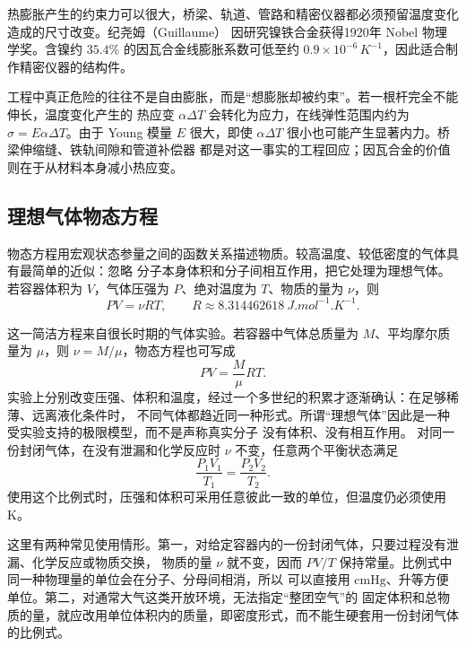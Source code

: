 热膨胀产生的约束力可以很大，桥梁、轨道、管路和精密仪器都必须预留温度变化造成的尺寸改变。纪尧姆（Guillaume）
因研究镍铁合金获得1920年 Nobel 物理学奖。含镍约 $35.4\%$ 的因瓦合金线膨胀系数可低至约
$0.9\times10^{-6}\,\si{K^{-1}}$，因此适合制作精密仪器的结构件。

工程中真正危险的往往不是自由膨胀，而是“想膨胀却被约束”。若一根杆完全不能伸长，温度变化产生的
热应变 $\alpha\Delta T$ 会转化为应力，在线弹性范围内约为 $\sigma=E\alpha\Delta T$。由于 Young
模量 $E$ 很大，即使 $\alpha\Delta T$ 很小也可能产生显著内力。桥梁伸缩缝、铁轨间隙和管道补偿器
都是对这一事实的工程回应；因瓦合金的价值则在于从材料本身减小热应变。

\subsection{理想气体物态方程}\label{ch14:sec:ideal-gas}

物态方程用宏观状态参量之间的函数关系描述物质。较高温度、较低密度的气体具有最简单的近似：忽略
分子本身体积和分子间相互作用，把它处理为理想气体。若容器体积为 $V$，气体压强为 $P$、绝对温度为
$T$、物质的量为 $\nu$，则
\begin{equation}
  \boxed{PV=\nu RT},
  \qquad R\approx\SI{8.314462618}{J.mol^{-1}.K^{-1}}.
\end{equation}

这一简洁方程来自很长时期的气体实验。若容器中气体总质量为 $M$、平均摩尔质量为 $\mu$，则
$\nu=M/\mu$，物态方程也可写成
\begin{equation}
  PV=\frac{M}{\mu}RT.
\end{equation}
实验上分别改变压强、体积和温度，经过一个多世纪的积累才逐渐确认：在足够稀薄、远离液化条件时，
不同气体都趋近同一种形式。所谓“理想气体”因此是一种受实验支持的极限模型，而不是声称真实分子
没有体积、没有相互作用。
对同一份封闭气体，在没有泄漏和化学反应时 $\nu$ 不变，任意两个平衡状态满足
\begin{equation}
  \boxed{\frac{P_1V_1}{T_1}=\frac{P_2V_2}{T_2}}.
\end{equation}
使用这个比例式时，压强和体积可采用任意彼此一致的单位，但温度仍必须使用 K。

这里有两种常见使用情形。第一，对给定容器内的一份封闭气体，只要过程没有泄漏、化学反应或物质交换，
物质的量 $\nu$ 就不变，因而 $PV/T$ 保持常量。比例式中同一种物理量的单位会在分子、分母间相消，所以
可以直接用 $\mathrm{cmHg}$、升等方便单位。第二，对通常大气这类开放环境，无法指定“整团空气”的
固定体积和总物质的量，就应改用单位体积内的质量，即密度形式，而不能生硬套用一份封闭气体的比例式。

